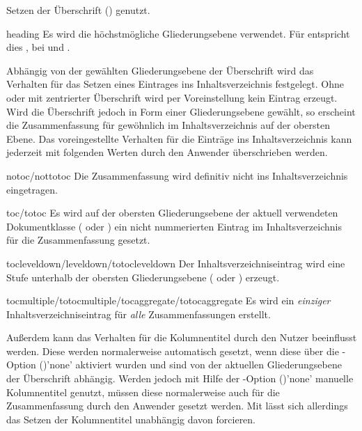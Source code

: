 \begin{Declaration*}{}
\begin{Declaration*}{}
\begin{Declaration*}{}
\begin{Declaration}[%
  v2.02!\Option{abstract=multiple}:ersetzt \Option{abstract=double};%
  v2.02!\Option{abstract=tocleveldown};%
  v2.02!\Option{abstract=markboth};%
  v2.04!\Option{abstract=tocmultiple}%
]{}
\begin{values}{}
  Setzen der Überschrift () genutzt. 
\item[heading]
  Es wird die höchstmögliche Gliederungsebene verwendet. Für 
   entspricht dies , bei 
   und  .
\end{values}
%
Abhängig von der gewählten Gliederungsebene der Überschrift wird das Verhalten 
für das Setzen eines Eintrages ins Inhaltsverzeichnis festgelegt. Ohne oder mit 
zentrierter Überschrift wird per Voreinstellung kein Eintrag erzeugt. Wird die 
Überschrift jedoch in Form einer Gliederungsebene gewählt, so erscheint die 
Zusammenfassung für gewöhnlich im Inhaltsverzeichnis auf der obersten Ebene. 
Das voreingestellte Verhalten für die Einträge ins Inhaltsverzeichnis kann 
jederzeit mit folgenden Werten durch den Anwender überschrieben werden.
%
\begin{values}{}
\item[notoc/nottotoc]
  Die Zusammenfassung wird definitiv nicht ins Inhaltsverzeichnis eingetragen.
\item[toc/totoc]
  Es wird auf der obersten Gliederungsebene der aktuell verwendeten 
  Dokumentklasse ( oder ) ein nicht 
  nummerierten Eintrag im Inhaltsverzeichnis für die Zusammenfassung gesetzt.
\item[tocleveldown/leveldown/totocleveldown]
  Der Inhaltsverzeichniseintrag wird eine Stufe unterhalb der obersten 
  Gliederungsebene ( oder ) erzeugt.
\item[tocmultiple/totocmultiple/tocaggregate/totocaggregate]
  Es wird ein \emph{einziger} Inhaltsverzeichniseintrag für \emph{alle} 
  Zusammenfassungen erstellt.
\end{values}
%
Außerdem kann das Verhalten für die Kolumnentitel durch den Nutzer beeinflusst 
werden. Diese werden normalerweise automatisch gesetzt, wenn diese über die 
\KOMAScript-Option ()'none' 
aktiviert wurden und sind von der aktuellen Gliederungsebene der Überschrift 
abhängig. Werden jedoch mit Hilfe der \KOMAScript-Option 
()'none' manuelle Kolumnentitel 
genutzt, müssen diese normalerweise auch für die Zusammenfassung durch den 
Anwender gesetzt werden. Mit  lässt sich allerdings 
das Setzen der Kolumnentitel unabhängig davon forcieren.

\end{Declaration}
\end{Declaration*}
\end{Declaration*}
\end{Declaration*}
